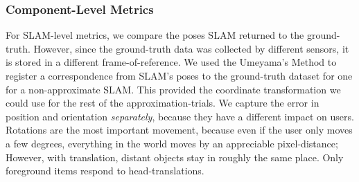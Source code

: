 \subsubsection{Component-Level Metrics}

For SLAM-level metrics, we compare the poses SLAM returned to the ground-truth. However, since the ground-truth data was collected by different sensors, it is stored in a different frame-of-reference. We used the Umeyama's Method to register a correspondence from SLAM's poses to the ground-truth dataset for one for a non-approximate SLAM\cite{88573}. This provided the coordinate transformation we could use for the rest of the approximation-trials. We capture the error in position and orientation \textit{separately}, because they have a different impact on users. Rotations are the most important movement, because even if the user only moves a few degrees, everything in the world moves by an appreciable pixel-distance; However, with translation, distant objects stay in roughly the same place. Only foreground items respond to head-translations.
